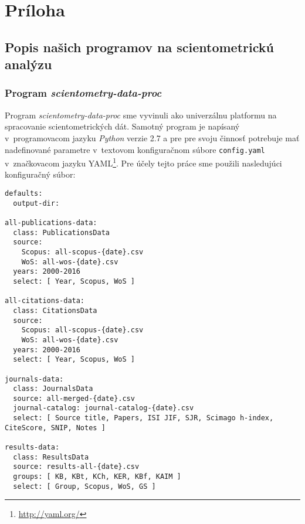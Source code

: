 \chapter*{Príloha}

\section*{Popis našich programov na scientometrickú analýzu}


\subsection*{Program \emph{scientometry-data-proc}}

Program \emph{scientometry-data-proc} sme vyvinuli ako univerzálnu platformu na
spracovanie scientometrických dát.  Samotný program je napísaný v~programovacom
jazyku \emph{Python} verzie 2.7 a pre pre svoju činnosť potrebuje mať nadefinované
parametre v~textovom konfiguračnom súbore \verb|config.yaml| v~značkovacom
jazyku YAML\footnote{\url{http://yaml.org/}}. Pre účely tejto práce sme použili
nasledujúci konfiguračný súbor:

\begin{source}
\begin{verbatim}
defaults:
  output-dir:

all-publications-data:
  class: PublicationsData
  source:
    Scopus: all-scopus-{date}.csv
    WoS: all-wos-{date}.csv
  years: 2000-2016
  select: [ Year, Scopus, WoS ]

all-citations-data:
  class: CitationsData
  source:
    Scopus: all-scopus-{date}.csv
    WoS: all-wos-{date}.csv
  years: 2000-2016
  select: [ Year, Scopus, WoS ]

journals-data:
  class: JournalsData
  source: all-merged-{date}.csv
  journal-catalog: journal-catalog-{date}.csv
  select: [ Source title, Papers, ISI JIF, SJR, Scimago h-index, CiteScore, SNIP, Notes ]

results-data:
  class: ResultsData
  source: results-all-{date}.csv
  groups: [ KB, KBt, KCh, KER, KBf, KAIM ]
  select: [ Group, Scopus, WoS, GS ]
\end{verbatim}
\end{source}

